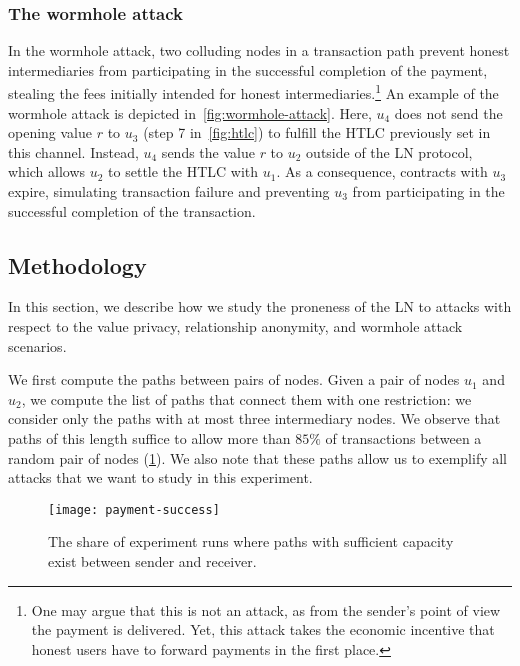 \subsubsection{The wormhole attack~\cite{Malavolta2019}}
In the wormhole attack, two colluding nodes in a transaction path prevent honest intermediaries from 
participating in the successful completion of the payment, stealing the 
fees initially intended for honest intermediaries.\footnote{One may argue that this is not an attack, as from the sender's point of view the payment is delivered. Yet, this attack takes the economic incentive that honest users have to forward payments in the first place.} 
An example of the wormhole attack is depicted in~\cref{fig:wormhole-attack}. 
Here, $u_4$ does not send the opening value $r$ to $u_3$ (step 7 in~\cref{fig:htlc}) to fulfill the HTLC previously set in this channel. 
Instead, $u_4$ sends the value $r$ to $u_2$ outside of the LN protocol, which allows $u_2$ to settle the HTLC with $u_1$. 
As a consequence, contracts with $u_3$ expire, simulating transaction failure and
preventing $u_3$ from participating in the successful completion of the transaction. 



\subsection{Methodology}
In this section, we describe how we study the proneness of the LN to attacks with respect to the value privacy, relationship anonymity, and wormhole attack scenarios. 

We first compute the paths between pairs of nodes.
Given a pair of nodes $u_1$ and $u_2$, 
we compute the list of paths that connect them with one restriction:
we consider only the paths with at most three intermediary nodes.
We observe that paths of this length suffice to allow more than $85\%$ of 
transactions between a random pair of nodes (\cref{fig:payment-success}).
We also note that these paths allow us to exemplify all attacks that we want to study in this experiment.
\begin{figure}
	\centering
	\texttt{[image: payment-success]}
	\caption{The share of experiment runs where paths with sufficient capacity exist between sender and receiver.}
	\label{fig:payment-success}
\end{figure}

